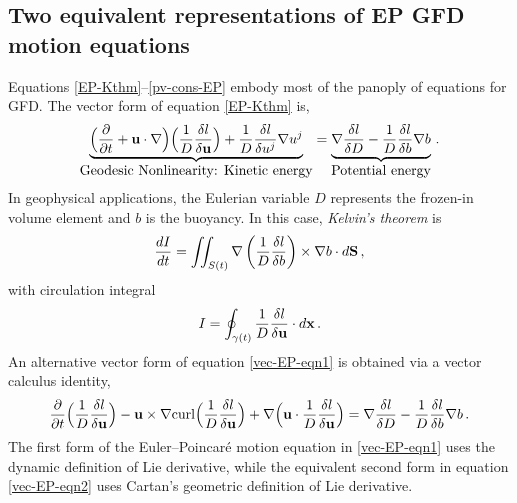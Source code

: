 \documentclass[11pt, oneside]{article}   	%
\numberwithin{equation}{section}
\theoremstyle{plain}
\theoremstyle{definition}
\theoremstyle{remark}
\newcommand{\<}{\langle}
\renewcommand{\>}{\rangle}
\begin{document}
\subsection*{Two equivalent representations of EP GFD motion equations}
Equations \eqref{EP-Kthm}--\eqref{pv-cons-EP} embody most of the panoply
of equations for GFD.  The vector form of equation \eqref{EP-Kthm} is,
%
\begin{align}\label{vec-EP-eqn1}
\underbrace{\Big({\partial\over \partial t} + \mathbf{u}\cdot\nabla\Big)
\Big({1\over D}{\delta l\over \delta \mathbf{u}}\Big)
+{1\over D}{\delta l\over \delta u^j}\nabla u^j}
_{\hbox{Geodesic Nonlinearity: Kinetic energy}}
= \underbrace{\nabla {\delta l\over \delta D}
-{1\over D} {\delta l\over \delta b}\nabla b}_{\hbox{Potential energy}}
\,.\end{align}
%
In geophysical applications, the Eulerian variable $D$ represents
the frozen-in volume element and $b$ is the buoyancy. In this case,
\emph{Kelvin's theorem} is
\[
\frac{d I}{dt}
=\int\!\!\!\int_{S(t)}
\nabla \left({1\over D} {\delta l\over \delta b}\right)
\times\nabla b \cdot d \mathbf{S} 
\,,\]
%
with circulation integral
\[
I=\oint_{\gamma(t)} {1\over D}{\delta l\over \delta \mathbf{u}}\cdot d\mathbf{x}
\,.\]
%
An alternative vector form of equation \eqref{vec-EP-eqn1} is obtained via a vector calculus identity,
\begin{align}\label{vec-EP-eqn2}
{\partial\over \partial t} \Big({1\over D}{\delta l\over \delta \mathbf{u}}\Big)
-  \mathbf{u}\times {\nabla}{\rm curl} \Big({1\over D}{\delta l\over \delta \mathbf{u}}\Big)
+ \nabla \Big(\mathbf{u}\cdot{1\over D}{\delta l \over \delta \mathbf{u}}\Big)
= \nabla {\delta l\over \delta D}
- {1\over D} {\delta l\over \delta b}\nabla b
\,.\end{align}
The first form of the Euler--Poincar\'e motion equation in \eqref{vec-EP-eqn1} uses the dynamic definition of Lie derivative,
while the equivalent second form in equation \eqref{vec-EP-eqn2} uses Cartan's geometric definition of Lie derivative. 
\end{document}
